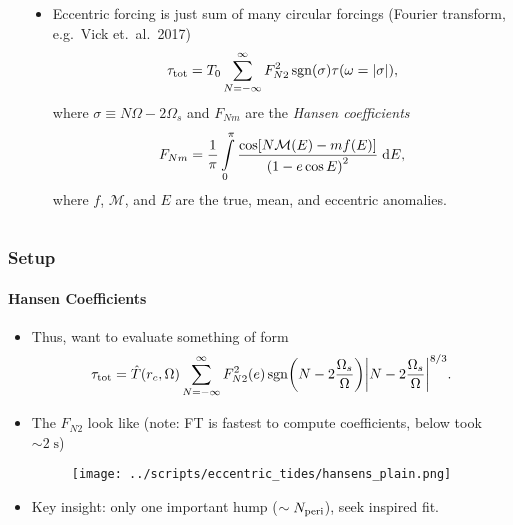 \documentclass[dvipsnames,8pt]{beamer}
\DeclareMathOperator{\sgn}{sgn}
\DeclarePairedDelimiter\abs{\lvert}{\rvert}
\DeclarePairedDelimiter\p{\lparen}{\rparen}
\DeclarePairedDelimiter\s{\lbrack}{\rbrack}
\begin{document}
\begin{frame}
\begin{columns}
\begin{column}{0.5\textwidth}
\begin{itemize}
            \end{itemize}
        \end{column}
        \begin{column}{0.5\textwidth}
            \begin{itemize}
                \item Eccentric forcing is just sum of many circular forcings
                    (Fourier transform, e.g.\ Vick et.\ al.\ 2017)
                    \begin{equation*}
                        \tau_{\rm tot} = T_0 \sum\limits_{N = -\infty}^\infty
                            F_{N2}^2 \sgn\p*{\sigma} \tau
                                \p*{\omega = \abs*{\sigma}},
                    \end{equation*}
                    where $\sigma \equiv N\Omega - 2\Omega_s$ and $F_{Nm}$ are
                    the \emph{Hansen coefficients}
                    \begin{equation*}
                        F_{Nm} = \frac{1}{\pi}\int\limits_{0}^{\pi}
                            \frac{\cos\s*{N\mathcal{M}(E) - mf(E)}}
                                {\p*{1 - e\cos E}^2}\;\mathrm{d}E,
                    \end{equation*}
                    where $f$, $\mathcal{M}$, and $E$ are the true, mean, and
                    eccentric anomalies.
            \end{itemize}
        \end{column}
    \end{columns}
\end{frame}

\begin{frame}
    \frametitle{Setup}
    \framesubtitle{Hansen Coefficients}

    \begin{itemize}
        \item Thus, want to evaluate something of form
            \begin{equation*}
                \tau_{\rm tot} = \hat{T}(r_c, \Omega)
                    \sum\limits_{N = -\infty}^\infty F_{N2}^2(e)
                        \sgn\p*{N - 2\frac{\Omega_s}{\Omega}}
                        \abs*{N - 2\frac{\Omega_s}{\Omega}}^{8/3}.
            \end{equation*}
        \item The $F_{N2}$ look like (note: FT is fastest to compute
            coefficients, below took $\sim 2\;\mathrm{s}$)
            \begin{figure}[h]
                \centering
                \texttt{[image: ../scripts/eccentric\_tides/hansens\_plain.png]}
            \end{figure}
        \item Key insight: only one important hump ($\sim N_{\rm peri}$), seek
            inspired fit.
    \end{itemize}
\end{frame}
\end{document}
